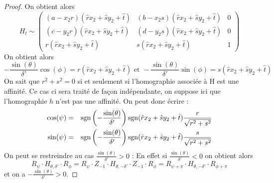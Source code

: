 \begin{proof}
On obtient alors
\begin{equation*}
H_t
  \sim 
  \begin{pmatrix}
 (a-x_2 r)(\hat r x_2 + \hat s y_2 +\hat t)&(b-x_2 s)(\hat r x_2 + \hat s y_2 +\hat t)& 0\\
  (c-y_2 r)(\hat r x_2 + \hat s y_2 +\hat t)&(d-y_2 s)(\hat r x_2 + \hat s y_2 +\hat t)& 0\\
  r(\hat r x_2 + \hat s y_2 +\hat t) & s(\hat r x_2 + \hat s y_2 +\hat t) &1
  \end{pmatrix} 
\end{equation*}
On obtient alors 
 \begin{equation*}
 -\frac{\sin(\theta)}{\delta'}\cos(\phi)=r(\hat r x_2 + \hat s y_2 +\hat t)\text{ et } -\frac{\sin(\theta)}{\delta'}\sin(\phi)=s(\hat r x_2 + \hat s y_2 +\hat t)
 \end{equation*}
 On sait que $r^{2}+s^{2}=0$ si et seulement si l'homographie associée à H est une affinité. Ce cas ci sera traité de façon indépendante, on suppose ici que l'homographie $h$ n'est pas une affinité. On peut donc écrire :
 \begin{eqnarray*}
 \cos(\psi) &=& \operatorname{sgn}\left(-\frac{\sin(\theta)}{ \delta'}\right)\operatorname{sgn}(\hat r x_2 + \hat s y_2 +\hat t)\frac{r}{\sqrt{r^{2}+s^{2}}}\\
 \sin(\psi) &=& \operatorname{sgn}\left(-\frac{\sin(\theta)}{ \delta'}\right)\operatorname{sgn}(\hat r x_2 + \hat s y_2 +\hat t)\frac{s}{\sqrt{r^{2}+s^{2}}}
 \end{eqnarray*}
 On peut se restreindre au cas $\frac{\sin(\theta)}{\delta'}>0$ :
 En effet si $\frac{\sin(\theta)}{\delta'}<0$ on obtient alors
 \begin{equation*}
 R_{\psi} \cdot H_{\theta,\delta'} \cdot R_{\phi}=R_{\psi} \cdot Z_{-1}\cdot H_{\theta,-\delta'}\cdot Z_{-1} \cdot R_{\phi}= R_{\psi+\pi} \cdot H_{\theta,-\delta'}\cdot R_{\phi+\pi}
 \end{equation*}
 et on a $-\frac{\sin(\theta)}{\delta'}>0$.



\end{proof}

